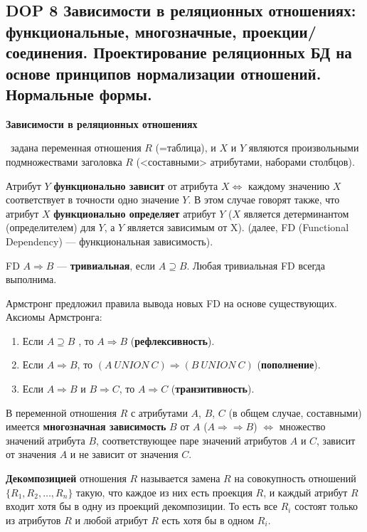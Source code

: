 \subsection{DOP 8 Зависимости  в  реляционных  отношениях:  функциональные,  многозначные,  проекции/соединения. Проектирование реляционных БД на основе принципов нормализации отношений. Нормальные формы.}

\textbf{Зависимости в реляционных отношениях}

\mathLet \ задана переменная отношения $R$ (=таблица), и $X$ и $Y$ являются произвольными подмножествами заголовка $R$ (<составными> атрибутами, наборами столбцов).

Атрибут $Y$ \textbf{функционально зависит} от атрибута $X \iff$ каждому значению $X$ соответствует в точности одно значение $Y$.
В этом случае говорят также, что атрибут $X$ \textbf{функционально определяет} атрибут $Y$ ($X$ является детерминантом (определителем) для $Y$, а $Y$ является зависимым от X). (далее, FD (Functional Dependency) --- функциональная зависимость).

FD $A \Rightarrow B$ --- \textbf{тривиальная}, если $A \supseteq B$. 
Любая тривиальная FD всегда выполнима.

Армстронг предложил правила вывода новых FD на основе существующих.
Аксиомы Армстронга:
\begin{enumerate}
    \item Если $A \supseteq B$ , то $A \Rightarrow B$ (\textbf{рефлексивность}).
    \item Если $A \Rightarrow B$, то $(A~UNION~C) \Rightarrow (B~UNION~C)$ (\textbf{пополнение}).
    \item Если $A \Rightarrow B$ и $B \Rightarrow C$, то $A \Rightarrow C$ (\textbf{транзитивность}).
\end{enumerate}


В переменной отношения $R$ с атрибутами $A$, $B$, $C$ (в общем случае, составными) имеется \textbf{многозначная зависимость} $B$ от $A$ ($A \Rightarrow\Rightarrow B$) $\iff$ множество значений атрибута $B$, соответствующее паре значений атрибутов $A$ и $C$, зависит от значения $A$ и не зависит от значения $C$.

\textbf{Декомпозицией} отношения $R$ называется замена $R$ на совокупность отношений $\{R_1, R_2, \dots , R_n\}$ такую, что каждое из них есть проекция $R$, и каждый атрибут $R$ входит хотя бы в одну из проекций декомпозиции.
То есть все $R_i$ состоят только из атрибутов $R$ и любой атрибут $R$ есть хотя бы в одном $R_i$.

